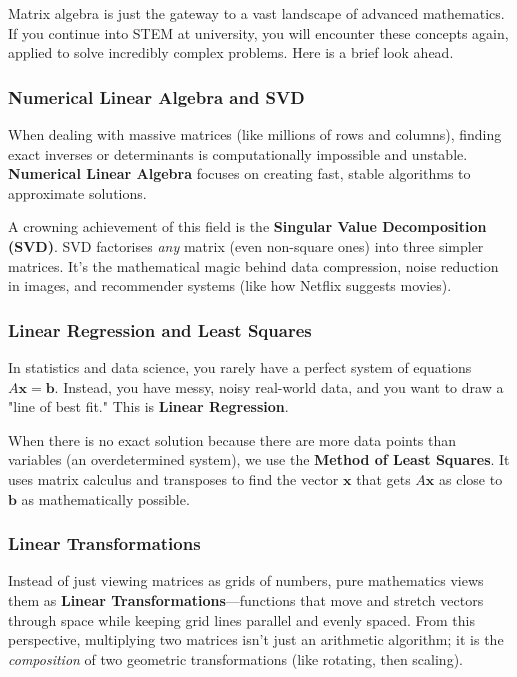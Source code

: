 
Matrix algebra is just the gateway to a vast landscape of advanced mathematics. If you continue into STEM at university, you will encounter these concepts again, applied to solve incredibly complex problems. Here is a brief look ahead.

\subsubsection*{Numerical Linear Algebra and SVD}
When dealing with massive matrices (like millions of rows and columns), finding exact inverses or determinants is computationally impossible and unstable. \textbf{Numerical Linear Algebra} focuses on creating fast, stable algorithms to approximate solutions. 

A crowning achievement of this field is the \textbf{Singular Value Decomposition (SVD)}. SVD factorises \emph{any} matrix (even non-square ones) into three simpler matrices. It's the mathematical magic behind data compression, noise reduction in images, and recommender systems (like how Netflix suggests movies).

\subsubsection*{Linear Regression and Least Squares}
In statistics and data science, you rarely have a perfect system of equations $A\mathbf{x} = \mathbf{b}$. Instead, you have messy, noisy real-world data, and you want to draw a "line of best fit." This is \textbf{Linear Regression}. 

When there is no exact solution because there are more data points than variables (an overdetermined system), we use the \textbf{Method of Least Squares}. It uses matrix calculus and transposes to find the vector $\mathbf{x}$ that gets $A\mathbf{x}$ as close to $\mathbf{b}$ as mathematically possible.

\subsubsection*{Linear Transformations}
Instead of just viewing matrices as grids of numbers, pure mathematics views them as \textbf{Linear Transformations}—functions that move and stretch vectors through space while keeping grid lines parallel and evenly spaced. From this perspective, multiplying two matrices isn't just an arithmetic algorithm; it is the \emph{composition} of two geometric transformations (like rotating, then scaling).

